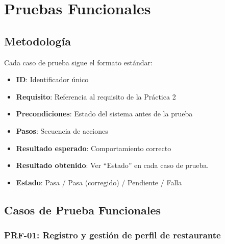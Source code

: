 \section{Pruebas Funcionales}

\subsection{Metodología}
Cada caso de prueba sigue el formato estándar:

\begin{itemize}
    \item \textbf{ID}: Identificador único
    \item \textbf{Requisito}: Referencia al requisito de la Práctica 2
    \item \textbf{Precondiciones}: Estado del sistema antes de la prueba
    \item \textbf{Pasos}: Secuencia de acciones
    \item \textbf{Resultado esperado}: Comportamiento correcto
    \item \textbf{Resultado obtenido}: Ver ``Estado'' en cada caso de prueba.
    \item \textbf{Estado}: Pasa / Pasa (corregido) / Pendiente / Falla
\end{itemize}

\subsection{Casos de Prueba Funcionales}

\subsubsection{PRF-01: Registro y gestión de perfil de restaurante}

